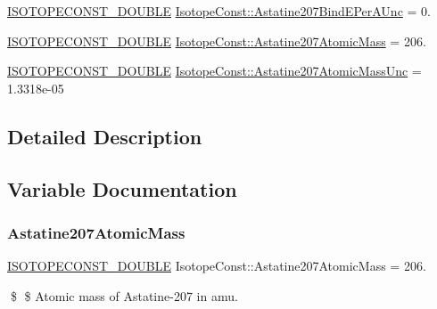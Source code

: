 \begin{DoxyCompactItemize}
\mbox{\hyperlink{group___isotope_const-_macros_ga8f45a7272ce02c0b4c65c44636ed719a}{I\+S\+O\+T\+O\+P\+E\+C\+O\+N\+S\+T\+\_\+\+D\+O\+U\+B\+LE}} \mbox{\hyperlink{group___isotope_const-_astatine-_at207_ga4ddc5a58b4ed869c3adcf20f1dbb29ca}{Isotope\+Const\+::\+Astatine207\+Bind\+E\+Per\+A\+Unc}} = 0.
\item 
\mbox{\hyperlink{group___isotope_const-_macros_ga8f45a7272ce02c0b4c65c44636ed719a}{I\+S\+O\+T\+O\+P\+E\+C\+O\+N\+S\+T\+\_\+\+D\+O\+U\+B\+LE}} \mbox{\hyperlink{group___isotope_const-_astatine-_at207_ga32f87f289bd7b3b0a8083dfd1c7fb1bf}{Isotope\+Const\+::\+Astatine207\+Atomic\+Mass}} = 206.
\item 
\mbox{\hyperlink{group___isotope_const-_macros_ga8f45a7272ce02c0b4c65c44636ed719a}{I\+S\+O\+T\+O\+P\+E\+C\+O\+N\+S\+T\+\_\+\+D\+O\+U\+B\+LE}} \mbox{\hyperlink{group___isotope_const-_astatine-_at207_gaed6d2f81d2508834803d44190bd6350b}{Isotope\+Const\+::\+Astatine207\+Atomic\+Mass\+Unc}} = 1.\+3318e-\/05
\end{DoxyCompactItemize}


\subsection{Detailed Description}


\subsection{Variable Documentation}
\mbox{\label{group___isotope_const-_astatine-_at207_ga32f87f289bd7b3b0a8083dfd1c7fb1bf}} 
\subsubsection{\texorpdfstring{Astatine207\+Atomic\+Mass}{Astatine207AtomicMass}}
{\footnotesize\ttfamily \mbox{\hyperlink{group___isotope_const-_macros_ga8f45a7272ce02c0b4c65c44636ed719a}{I\+S\+O\+T\+O\+P\+E\+C\+O\+N\+S\+T\+\_\+\+D\+O\+U\+B\+LE}} Isotope\+Const\+::\+Astatine207\+Atomic\+Mass = 206.}

\$ \$ Atomic mass of Astatine-\/207 in amu. \mbox{\label{group___isotope_const-_astatine-_at207_gaed6d2f81d2508834803d44190bd6350b}} 
